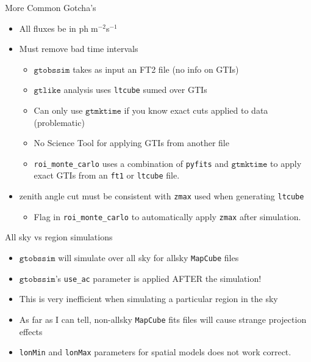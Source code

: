 \documentclass[12pt]{beamer}
\newcommand{\gtlike}{\ensuremath{\mathtt{gtlike}}\xspace}
\newcommand{\gtobssim}{\ensuremath{\mathtt{gtobssim}}\xspace}
\newcommand{\gtmktime}{\ensuremath{\mathtt{gtmktime}}\xspace}
\newcommand{\roimc}{\texttt{roi\_monte\_carlo}\xspace}
\newcommand{\mapcube}{\texttt{MapCube}\xspace}
\newcommand{\ftone}{\texttt{ft1}\xspace}
\begin{document}
\begin{frame}{More Common Gotcha's}
  \begin{itemize}
    \item All fluxes be in ph$\;$m$^{-2}$s$^{-1}$
    \item Must remove bad time intervals
      \begin{itemize}
        \item \gtobssim takes as input an FT2 file (no info on GTIs)
        \item \gtlike analysis uses \texttt{ltcube} sumed over GTIs
        \item Can only use \gtmktime if you know exact cuts applied to data (problematic)
        \item No Science Tool for applying GTIs from another file
        \item \roimc uses a combination of \texttt{pyfits} and \gtmktime to apply exact GTIs
          from an \ftone or \texttt{ltcube} file.
      \end{itemize}
    \item zenith angle cut must be consistent with \texttt{zmax} used when generating \texttt{ltcube}
      \begin{itemize}
        \item Flag in \roimc to automatically apply \texttt{zmax} after simulation.
      \end{itemize}
  \end{itemize}
\end{frame}

\begin{frame}{All sky vs region simulations}
  \begin{itemize}
    \item \gtobssim will simulate over all sky for allsky \mapcube files
    \item \gtobssim's \texttt{use\_ac} parameter is applied AFTER the simulation!
    \item This is very inefficient when simulating a particular region in the sky
    \item As far as I can tell, non-allsky \mapcube fits files will cause strange projection effects
    \item \texttt{lonMin} and \texttt{lonMax} parameters for spatial models does not work correct.
  \end{itemize}
\end{frame}
\end{document}
